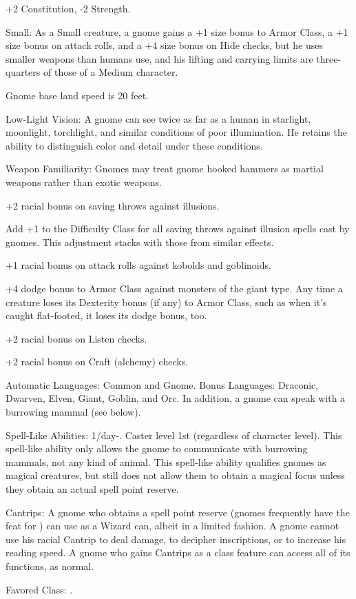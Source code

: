 \begin{list}{}{\leftmargin=1em}
 \item +2 Constitution, -2 Strength.
 \item Small: As a Small creature, a gnome gains a +1 size bonus to Armor Class, a +1 size bonus on attack rolls, and a +4 size bonus on Hide checks, but he uses smaller weapons than humans use, and his lifting and carrying limits are three-quarters of those of a Medium character.
 \item Gnome base land speed is 20 feet.
 \item Low-Light Vision: A gnome can see twice as far as a human in starlight, moonlight, torchlight, and similar conditions of poor illumination. He retains the ability to distinguish color and detail under these conditions.
 \item Weapon Familiarity: Gnomes may treat gnome hooked hammers as martial weapons rather than exotic weapons.
 \item +2 racial bonus on saving throws against illusions.
 \item Add +1 to the Difficulty Class for all saving throws against illusion spells cast by gnomes. This adjustment stacks with those from similar effects.
 \item +1 racial bonus on attack rolls against kobolds and goblinoids.
 \item +4 dodge bonus to Armor Class against monsters of the giant type. Any time a creature loses its Dexterity bonus (if any) to Armor Class, such as when it's caught flat-footed, it loses its dodge bonus, too.
 \item +2 racial bonus on Listen checks.
 \item +2 racial bonus on Craft (alchemy) checks.
 \item Automatic Languages: Common and Gnome. Bonus Languages: Draconic, Dwarven, Elven, Giant, Goblin, and Orc. In addition, a gnome can speak with a burrowing mammal (see below).
 \item Spell-Like Abilities: 1/day-. Caster level 1st (regardless of character level). This spell-like ability only allows the gnome to communicate with burrowing mammals, not any kind of animal. This spell-like ability qualifies gnomes as magical creatures, but still does not allow them to obtain a magical focus unless they obtain an actual spell point reserve.
 \item Cantrips: A gnome who obtains a spell point reserve (gnomes frequently have the  feat for ) can use  as a Wizard can, albeit in a limited fashion. A gnome cannot use his racial Cantrip to deal damage, to decipher inscriptions, or to increase his reading speed. A gnome who gains Cantrips as a class feature can access all of its functions, as normal.
 \item Favored Class: .
\end{list}
